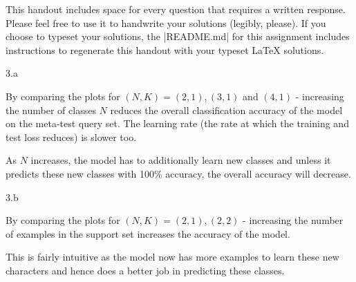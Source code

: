 


\def\assignmentnum{2 }
\def\assignmenttitle{XCS330 Problem Set \assignmentnum}

\usepackage{graphicx}
\graphicspath{ {./figures/} }

\pagestyle{myheadings} \markboth{}{\assignmenttitle}

This handout includes space for every question that requires a written response.
Please feel free to use it to handwrite your solutions (legibly, please).  If
you choose to typeset your solutions, the |README.md| for this assignment includes
instructions to regenerate this handout with your typeset \LaTeX{} solutions.


\LARGE
3.a
\normalsize

\begin{answer}
By comparing the plots for $(N, K) = (2, 1), (3, 1)$ and $(4, 1)$ - increasing the number of classes $N$ reduces the overall classification accuracy of the model on the meta-test query set. The learning rate (the rate at which the training and test loss reduces) is slower too. 

As $N$ increases, the model has to additionally learn new classes and unless it predicts these new classes with 100\% accuracy, the overall accuracy will decrease. 

\end{answer}

\clearpage

\LARGE
3.b
\normalsize

\begin{answer}
By comparing the plots for $(N, K) = (2, 1), (2, 2)$ - increasing the number of examples in the support set increases the accuracy of the model. 

This is fairly intuitive as the model now has more examples to learn these new characters and hence does a better job in predicting these classes. 
\end{answer}

